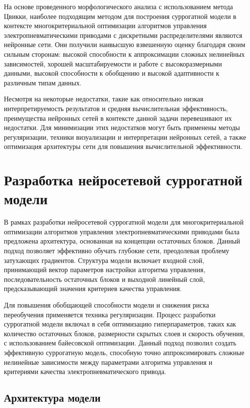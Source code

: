 На основе проведенного морфологического анализа с использованием метода
Цвикки, наиболее подходящим методом для построения суррогатной модели
в контексте многокритериальной оптимизации алгоритмов управления
электропневматическими приводами с дискретными распределителями
являются нейронные сети. Они получили наивысшую взвешенную оценку
благодаря своим сильным сторонам: высокой способности к аппроксимации
сложных нелинейных зависимостей, хорошей масштабируемости и работе с
высокоразмерными данными, высокой способности к обобщению и высокой
адаптивности к различным типам данных.

Несмотря на некоторые недостатки, такие как относительно низкая интерпретируемость
результатов и средняя вычислительная эффективность,
преимущества нейронных сетей в контексте данной задачи перевешивают
их недостатки. Для минимизации этих недостатков могут быть применены методы
регуляризации, техники визуализации и интерпретации нейронных сетей, а
также оптимизация архитектуры сети для повышения вычислительной эффективности.

\section{Разработка нейросетевой суррогатной модели}\label{sec:ch4/sec4}
В рамках разработки нейросетевой суррогатной модели для многокритериальной
оптимизации алгоритмов управления электропневматическими приводами была предложена
архитектура, основанная на концепции остаточных блоков. Данный подход позволяет
эффективно обучать глубокие сети, преодолевая проблему затухающих градиентов.
Структура модели включает входной слой, принимающий вектор параметров настройки
алгоритма управления, последовательность остаточных блоков и выходной линейный слой,
предсказывающий значения критериев качества управления.

Для повышения обобщающей способности модели и снижения
риска переобучения применяется техника регуляризации.
Процесс разработки суррогатной модели включал в себя оптимизацию
гиперпараметров, таких как количество остаточных блоков, размерности
скрытых слоев и скорость обучения, с использованием байесовской оптимизации.
Данный подход позволил создать эффективную суррогатную модель, способную
точно аппроксимировать сложные нелинейные зависимости между параметрами
алгоритма управления и критериями качества электропневматического привода.

\subsection{Архитектура модели}\label{sec:ch4/sec4/subsec1}

